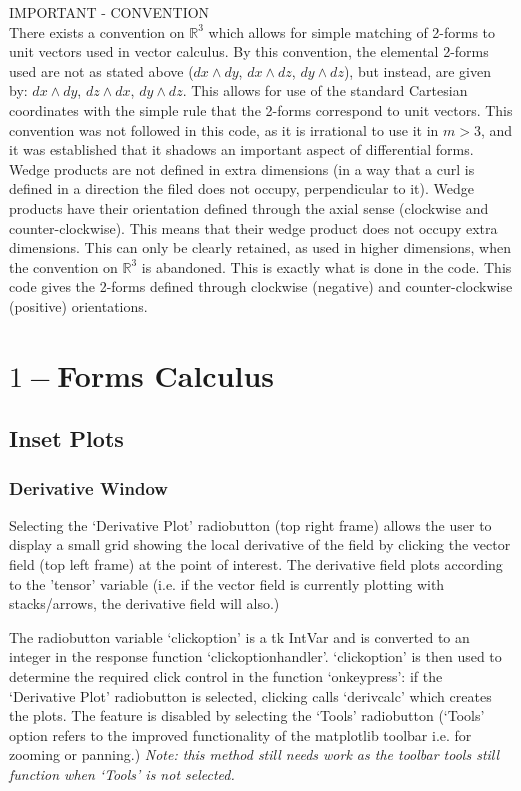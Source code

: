 \documentclass[12pt]{report}
\begin{document}
\begin{center}
	\Large
	IMPORTANT - CONVENTION\\
	\normalsize
	There exists a convention on $\mathbb{R}^{3}$ which allows for simple matching of 2-forms to unit vectors used in vector calculus. By this convention, the elemental 2-forms used are not as stated above ($ dx \wedge dy$, $ dx \wedge dz$, $ dy \wedge dz$), but instead, are given by: $dx \wedge dy$, $ dz \wedge dx$, $ dy \wedge dz$. This allows for use of the standard Cartesian coordinates with the simple rule that the 2-forms correspond to unit vectors. This convention was not followed in this code, as it is irrational to use it in $m>3$, and it was established that it shadows an important aspect of differential forms. Wedge products are not defined in extra dimensions (in a way that a curl is defined in a direction the filed does not occupy, perpendicular to it). Wedge products have their orientation defined through the axial sense (clockwise and counter-clockwise). This means that their wedge product does not occupy extra dimensions. This can only be clearly retained, as used in higher dimensions, when the convention on $\mathbb{R}^{3}$ is abandoned. This is exactly what is done in the code. This code gives the 2-forms defined through clockwise (negative) and counter-clockwise (positive) orientations.
\end{center}

\chapter{$1-$Forms Calculus}
\section{Inset Plots}
\subsection{Derivative Window}
Selecting the `Derivative Plot' radiobutton (top right frame) allows the user to display a small grid showing the local derivative of the field by clicking the vector field (top left frame) at the point of interest. The derivative field plots according to the 'tensor' variable (i.e. if the vector field is currently plotting with stacks/arrows, the derivative field will also.)

The radiobutton variable `click\textunderscore option' is a tk IntVar and is converted to an integer in the response function `click\textunderscore option\textunderscore handler'. `click\textunderscore option' is then used to determine the required click control in the function `on\textunderscore key\textunderscore press': if the `Derivative Plot' radiobutton is selected, clicking calls `deriv\textunderscore calc' which creates the plots. The feature is disabled by selecting the `Tools' radiobutton (`Tools' option refers to the improved functionality of the matplotlib toolbar i.e. for zooming or panning.) \textit{Note: this method still needs work as the toolbar tools still function when `Tools' is not selected.}
\end{document}
